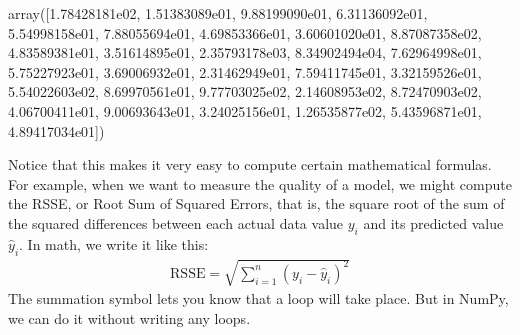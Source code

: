 \documentclass[letterpaper,10pt,english]{sphinxmanual}
\begin{document}
\begin{sphinxVerbatim}[commandchars=\\\{\}]
   
\end{sphinxVerbatim}

\begin{sphinxVerbatim}[commandchars=\\\{\}]
array([1.78428181e\PYGZhy{}02, 1.51383089e\PYGZhy{}01, 9.88199090e\PYGZhy{}01, 6.31136092e\PYGZhy{}01,
       5.54998158e\PYGZhy{}01, 7.88055694e\PYGZhy{}01, 4.69853366e\PYGZhy{}01, 3.60601020e\PYGZhy{}01,
       8.87087358e\PYGZhy{}02, 4.83589381e\PYGZhy{}01, 3.51614895e\PYGZhy{}01, 2.35793178e\PYGZhy{}03,
       8.34902494e\PYGZhy{}04, 7.62964998e\PYGZhy{}01, 5.75227923e\PYGZhy{}01, 3.69006932e\PYGZhy{}01,
       2.31462949e\PYGZhy{}01, 7.59411745e\PYGZhy{}01, 3.32159526e\PYGZhy{}01, 5.54022603e\PYGZhy{}02,
       8.69970561e\PYGZhy{}01, 9.77703025e\PYGZhy{}02, 2.14608953e\PYGZhy{}02, 8.72470903e\PYGZhy{}02,
       4.06700411e\PYGZhy{}01, 9.00693643e\PYGZhy{}01, 3.24025156e\PYGZhy{}01, 1.26535877e\PYGZhy{}02,
       5.43596871e\PYGZhy{}01, 4.89417034e\PYGZhy{}01])
\end{sphinxVerbatim}

Notice that this makes it very easy to compute certain mathematical formulas.  For example, when we want to measure the quality of a model, we might compute the RSSE, or Root Sum of Squared Errors, that is, the square root of the sum of the squared differences between each actual data value \(y_i\) and its predicted value \(\hat y_i\).  In math, we write it like this:
\begin{equation*}
\begin{split} \text{RSSE} = \sqrt{\sum_{i=1}^n (y_i-\hat y_i)^2} \end{split}
\end{equation*}
The summation symbol lets you know that a loop will take place.  But in NumPy, we can do it without writing any loops.

\begin{sphinxVerbatim}[commandchars=\\\{\}]
      \PYG{p}{[}      \PYG{p}{]}    
   \PYG{p}{[}      \PYG{p}{]}    
           
\end{sphinxVerbatim}
\end{document}
